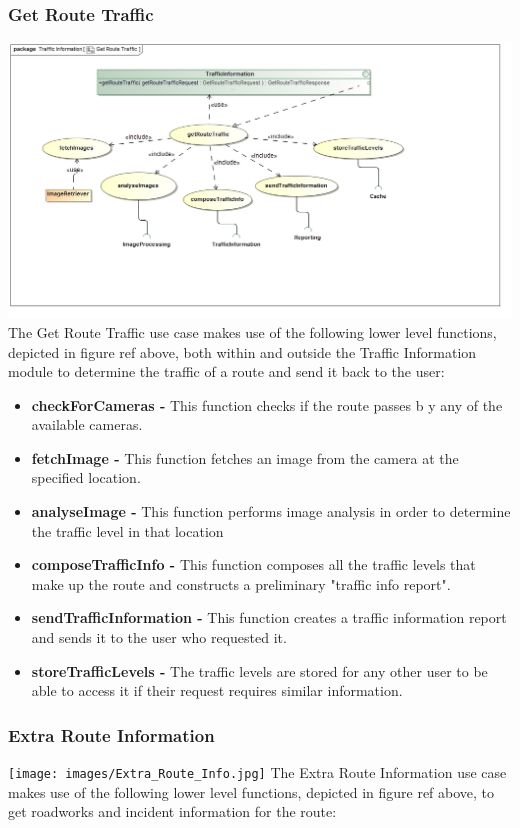 \documentclass[a4paper,12pt]{article}
\begin{document}
\subsubsection{Get Route Traffic}
\includegraphics[width=\textwidth]{images/Get_Route_Traffic.jpg}
The Get Route Traffic use case makes use of the following lower level functions, depicted in {figure ref} above, both within and outside the Traffic Information module to determine the traffic of a route and send it back to the user:
\begin{itemize}
\item \textbf{checkForCameras -} This function checks if the route passes b y any of the available cameras.
\item \textbf{fetchImage -} This function fetches an image from the camera at the specified location.
\item \textbf{analyseImage -} This function performs image analysis in order to determine the traffic level in that location
\item \textbf{composeTrafficInfo -} This function composes all the traffic levels that make up the route and constructs a preliminary "traffic info report".
\item \textbf{sendTrafficInformation -} This function creates a traffic information report and sends it to the user who requested it.
\item \textbf{storeTrafficLevels -} The traffic levels are stored for any other user to be able to access it if their request requires similar information.
\end{itemize}

\subsubsection{Extra Route Information}
\texttt{[image: images/Extra\_Route\_Info.jpg]}
The Extra Route Information use case makes use of the following lower level functions, depicted in {figure ref} above, to get roadworks and incident information for the route:
\end{document}

